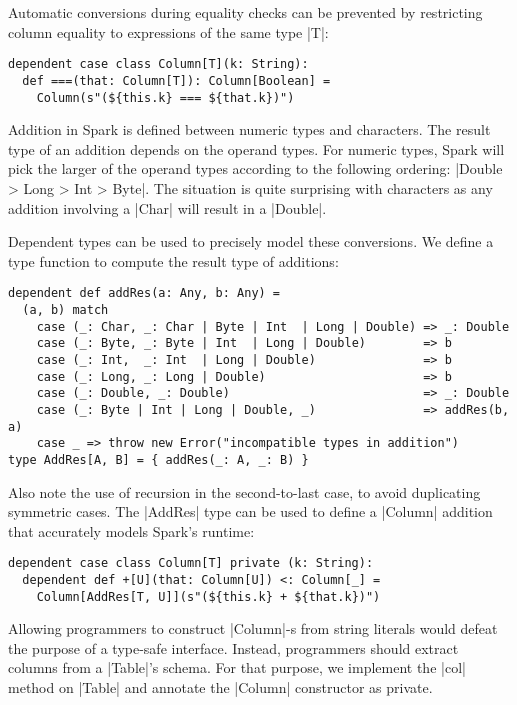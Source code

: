 Automatic conversions during equality checks can be prevented by restricting column equality to expressions of the same type |T|:

\begin{lstlisting}
dependent case class Column[T](k: String):
  def ===(that: Column[T]): Column[Boolean] =
    Column(s"(${this.k} === ${that.k})")
\end{lstlisting}

Addition in Spark is defined between numeric types and characters.
The result type of an addition depends on the operand types.
For numeric types, Spark will pick the larger of the operand types according to the following ordering: |Double > Long > Int > Byte|.
The situation is quite surprising with characters as any addition involving a |Char| will result in a |Double|.

Dependent types can be used to precisely model these conversions.
We define a type function to compute the result type of additions:

\begin{lstlisting}
dependent def addRes(a: Any, b: Any) =
  (a, b) match
    case (_: Char, _: Char | Byte | Int  | Long | Double) => _: Double
    case (_: Byte, _: Byte | Int  | Long | Double)        => b
    case (_: Int,  _: Int  | Long | Double)               => b
    case (_: Long, _: Long | Double)                      => b
    case (_: Double, _: Double)                           => _: Double
    case (_: Byte | Int | Long | Double, _)               => addRes(b, a)
    case _ => throw new Error("incompatible types in addition")
type AddRes[A, B] = { addRes(_: A, _: B) }
\end{lstlisting}

Also note the use of recursion in the second-to-last case, to avoid duplicating symmetric cases.
The |AddRes| type can be used to define a |Column| addition that accurately models Spark's runtime:

\begin{lstlisting}
dependent case class Column[T] private (k: String):
  dependent def +[U](that: Column[U]) <: Column[_] =
    Column[AddRes[T, U]](s"(${this.k} + ${that.k})")
\end{lstlisting}

Allowing programmers to construct |Column|-s from string literals would defeat the purpose of a type-safe interface.
Instead, programmers should extract columns from a |Table|'s schema.
For that purpose, we implement the |col| method on |Table| and annotate the |Column| constructor as private.

